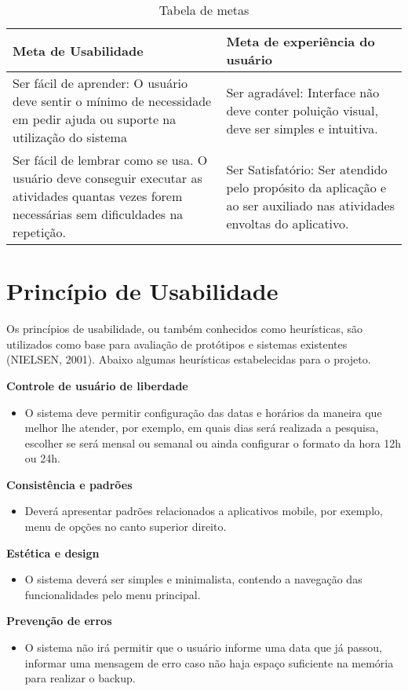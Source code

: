 \begin{table}[H]
	\centering
	\begin{tabular}{p{6cm}|p{6cm}}
		\toprule
			Meta de Usabilidade & Meta de experiência do usuário\\ \hline
		\midrule
			Ser fácil de aprender: O usuário deve sentir o mínimo de necessidade em pedir ajuda ou suporte na utilização do sistema & Ser agradável: Interface não deve conter poluição visual, deve ser simples e intuitiva. \\ \hline
			Ser fácil de lembrar como se usa. O usuário deve conseguir executar as atividades quantas vezes forem necessárias sem dificuldades na repetição. & Ser Satisfatório: Ser atendido pelo propósito da aplicação e ao ser auxiliado nas atividades envoltas do aplicativo. 
	\end{tabular}
	\caption{Tabela de metas}
	\label{tab01}
\end{table}

\section{Princípio de Usabilidade}
Os princípios de usabilidade, ou também conhecidos como heurísticas, são utilizados como base para avaliação de protótipos e sistemas existentes (NIELSEN, 2001).
Abaixo algumas heurísticas estabelecidas para o projeto.

\textbf{Controle de usuário de liberdade}
\begin{itemize}
	\item O sistema deve permitir configuração das datas e horários da maneira que melhor lhe atender, por exemplo, em quais dias será realizada a pesquisa, escolher se será mensal ou semanal ou ainda configurar o formato da hora 12h ou 24h.
\end{itemize}

\textbf{Consistência e padrões}
\begin{itemize}
	\item Deverá apresentar padrões relacionados a aplicativos mobile, por exemplo, menu de opções no canto superior direito.
\end{itemize}

\textbf{Estética e design}
\begin{itemize}
	\item O sistema deverá ser simples e minimalista, contendo a navegação das funcionalidades pelo menu principal.
\end{itemize}

\textbf{Prevenção de erros}
\begin{itemize}
	\item O sistema não irá permitir que o usuário informe uma data que já passou, informar uma mensagem de erro caso não haja espaço suficiente na memória para realizar o backup.
\end{itemize}